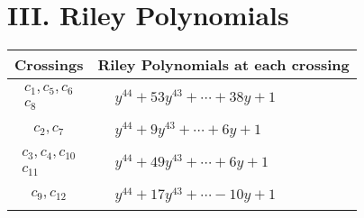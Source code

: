 \documentclass[1p]{elsarticle_modified}
\theoremstyle{definition}
\begin{document}
\centering \section*{ III. Riley Polynomials}
\begin{tabular}{m{50pt}|m{274pt}}
Crossings & \hspace{64pt}Riley Polynomials at each crossing \\
\hline $$\begin{aligned}c_{1},c_{5},c_{6}\\c_{8}\end{aligned}$$&$\begin{aligned}
&y^{44}+53 y^{43}+\cdots+38 y+1
\end{aligned}$\\
\hline $$\begin{aligned}c_{2},c_{7}\end{aligned}$$&$\begin{aligned}
&y^{44}+9 y^{43}+\cdots+6 y+1
\end{aligned}$\\
\hline $$\begin{aligned}c_{3},c_{4},c_{10}\\c_{11}\end{aligned}$$&$\begin{aligned}
&y^{44}+49 y^{43}+\cdots+6 y+1
\end{aligned}$\\
\hline $$\begin{aligned}c_{9},c_{12}\end{aligned}$$&$\begin{aligned}
&y^{44}+17 y^{43}+\cdots-10 y+1
\end{aligned}$\\
\hline
\end{tabular}
\vskip 2pc
\end{document}
